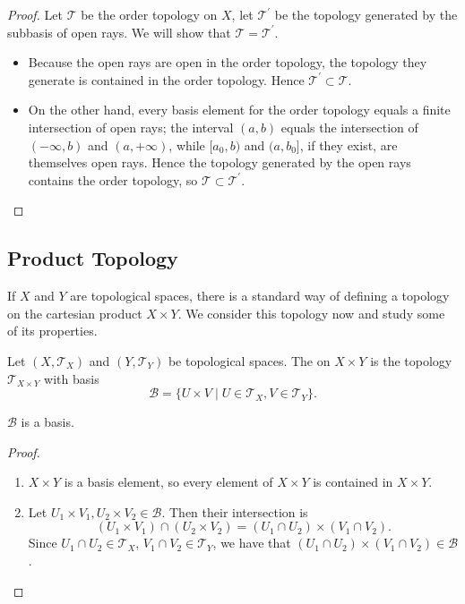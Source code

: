 \begin{proof}
Let $\mathcal{T}$ be the order topology on $X$, let $\mathcal{T}^\prime$ be the topology generated by the subbasis of open rays. We will show that $\mathcal{T}=\mathcal{T}^\prime$.
\begin{itemize}
\item Because the open rays are open in the order topology, the topology they generate is contained in the order topology. Hence $\mathcal{T}^\prime\subset\mathcal{T}$.
\item On the other hand, every basis element for the order topology equals a finite intersection of open rays; the interval $(a,b)$ equals the intersection of $(-\infty,b)$ and $(a,+\infty)$, while $[a_0,b)$ and $(a,b_0]$, if they exist, are themselves open rays. Hence the topology generated by the open rays contains the order topology, so $\mathcal{T}\subset\mathcal{T}^\prime$.
\end{itemize}
\end{proof}

\subsection{Product Topology}
If $X$ and $Y$ are topological spaces, there is a standard way of defining a topology on the cartesian product $X\times Y$. We consider this topology now and study some of its properties.

\begin{definition}
Let $(X,\mathcal{T}_X)$ and $(Y,\mathcal{T}_Y)$ be topological spaces. The  on $X\times Y$ is the topology $\mathcal{T}_{X\times Y}$ with basis
\[\mathcal{B}=\{U\times V\mid U\in\mathcal{T}_X,V\in\mathcal{T}_Y\}.\]
\end{definition}

\begin{lemma*}
$\mathcal{B}$ is a basis.
\end{lemma*}

\begin{proof} \
\begin{enumerate}[label=(\roman*)]
\item $X\times Y$ is a basis element, so every element of $X\times Y$ is contained in $X\times Y$.
\item Let $U_1\times V_1,U_2\times V_2\in\mathcal{B}$. Then their intersection is
\[(U_1\times V_1)\cap(U_2\times V_2)=(U_1\cap U_2)\times(V_1\cap V_2).\]
Since $U_1\cap U_2\in\mathcal{T}_X$, $V_1\cap V_2\in\mathcal{T}_Y$, we have that $(U_1\cap U_2)\times(V_1\cap V_2)\in\mathcal{B}$.
\end{enumerate}
\end{proof}

